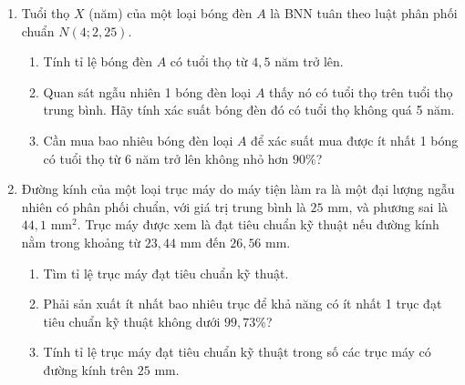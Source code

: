 \begin{enumerate}[label=\textbf{\arabic*.}]
    \item Tuổi thọ $X$ (năm) của một loại bóng đèn $A$ là BNN tuân theo luật phân phối chuẩn $N(4; 2{,}25)$.
    \begin{enumerate}[label=\alph*.]
        \item Tính tỉ lệ bóng đèn $A$ có tuổi thọ từ $4{,}5$ năm trở lên.
        \item Quan sát ngẫu nhiên 1 bóng đèn loại $A$ thấy nó có tuổi thọ trên tuổi thọ trung bình. Hãy tính xác suất bóng đèn đó có tuổi thọ không quá 5 năm.
        \item Cần mua bao nhiêu bóng đèn loại $A$ để xác suất mua được ít nhất 1 bóng có tuổi thọ từ 6 năm trở lên không nhỏ hơn $90\%$?
    \end{enumerate}

    \item Đường kính của một loại trục máy do máy tiện làm ra là một đại lượng ngẫu nhiên có phân phối chuẩn, với giá trị trung bình là $25\text{ mm}$, và phương sai là $44{,}1\text{ mm}^2$. Trục máy được xem là đạt tiêu chuẩn kỹ thuật nếu đường kính nằm trong khoảng từ $23{,}44\text{ mm}$ đến $26{,}56\text{ mm}$.
    \begin{enumerate}[label=\arabic*)]
        \item Tìm tỉ lệ trục máy đạt tiêu chuẩn kỹ thuật.
        \item Phải sản xuất ít nhất bao nhiêu trục để khả năng có ít nhất 1 trục đạt tiêu chuẩn kỹ thuật không dưới $99{,}73\%$?
        \item Tính tỉ lệ trục máy đạt tiêu chuẩn kỹ thuật trong số các trục máy có đường kính trên $25\text{ mm}$.
    \end{enumerate}
\end{enumerate}
